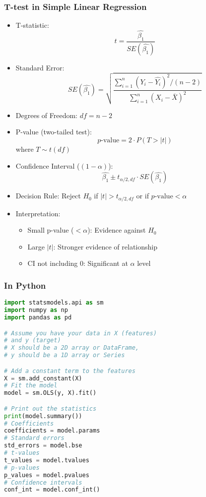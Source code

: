 \documentclass[xcolor=svgnames, t]{beamer}
\theoremstyle{definition}
\theoremstyle{plain}
\theoremstyle{remark}
\begin{document}
\begin{frame}[allowframebreaks]
\frametitle{T-test in Simple Linear Regression}

\begin{itemize}
    \item T-statistic:
    \[ t = \frac{\hat{\beta_1}}{SE(\hat{\beta_1})} \]
    \item Standard Error:
    \[ SE(\hat{\beta_1}) = \sqrt{\frac{\sum_{i=1}^n (Y_i - \hat{Y_i})^2 / (n-2)}{\sum_{i=1}^n (X_i - \bar{X})^2}} \]
    \item Degrees of Freedom: $df = n - 2$
\end{itemize}

\begin{itemize}
    \item P-value (two-tailed test):
    \[ p\text{-value} = 2 \cdot P(T > |t|) \]
    where $T \sim t(df)$
    \item Confidence Interval ($(1-\alpha)$):
    \[ \hat{\beta_1} \pm t_{\alpha/2, df} \cdot SE(\hat{\beta_1}) \]
\end{itemize}

\begin{itemize}
    \item Decision Rule: Reject $H_0$ if $|t| > t_{\alpha/2, df}$ or if $p\text{-value} < \alpha$
    \item Interpretation:
    \begin{itemize}
        \item Small p-value ($< \alpha$): Evidence against $H_0$
        \item Large $|t|$: Stronger evidence of relationship
        \item CI not including 0: Significant at $\alpha$ level
    \end{itemize}
\end{itemize}
\end{frame}

\begin{frame}
	\frametitle{In Python}
	\begin{lstlisting}[language=Python]
import statsmodels.api as sm
import numpy as np
import pandas as pd

# Assume you have your data in X (features)
# and y (target)
# X should be a 2D array or DataFrame, 
# y should be a 1D array or Series

# Add a constant term to the features 
X = sm.add_constant(X)
# Fit the model
model = sm.OLS(y, X).fit()

# Print out the statistics
print(model.summary())	
# Coefficients
coefficients = model.params
# Standard errors
std_errors = model.bse
# t-values
t_values = model.tvalues
# p-values
p_values = model.pvalues
# Confidence intervals
conf_int = model.conf_int()
\end{lstlisting}
	
\end{frame}
\end{document}
